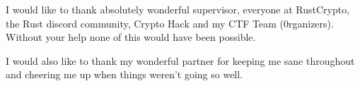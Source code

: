 I would like to thank absolutely wonderful supervisor, everyone at 
RustCrypto, the Rust discord community, Crypto Hack and my CTF Team (0rganizers).
Without your help none of this would have been possible.

I would also like to thank my wonderful partner for keeping me sane throughout and cheering me up when things weren't going so well.
